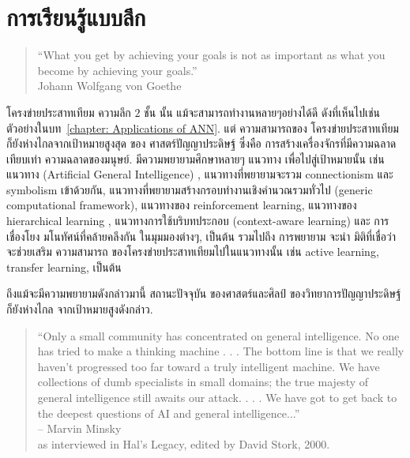 \chapter{การเรียนรู้แบบลึก}
\label{chapter: ANN deep learning}

\begin{verse}
``What you get by achieving your goals is not as important as what you become by achieving your goals.'' \\
Johann Wolfgang von Goethe
\end{verse}

โครงข่ายประสาทเทียม ความลึก $2$ ชั้น นั้น แม้จะสามารถทำงานหลายๆอย่างได้ดี ดังที่เห็นไปเช่น ตัวอย่างในบท~\ref{chapter: Applications of ANN}.
แต่ ความสามารถของ โครงข่ายประสาทเทียม ก็ยังห่างไกลจากเป้าหมายสูงสุด ของ ศาสตร์ปัญญาประดิษฐ์ ซึ่งคือ การสร้างเครื่องจักรที่มีความฉลาด เทียบเท่า ความฉลาดของมนุษย์.
มีความพยายามศึกษาหลายๆ แนวทาง เพื่อไปสู่เป้าหมายนั้น เช่น แนวทาง (Artificial General Intelligence)\cite{AGI2007a} , แนวทางที่พยายามจะรวม connectionism และ symbolism เข้าด้วยกัน\cite{Smolensky1988a, Smolensky1990a, ParkEtAl1995a}, แนวทางที่พยายามสร้างกรอบทำงานเชิงคำนวณรวมทั่วไป (generic computational framework)\cite{Prokopenko2014a}, แนวทางของ reinforcement learning, แนวทางของ hierarchical learning \cite{TaniNolfi1999a}, แนวทางการใช้บริบทประกอบ (context-aware learning)\cite{Turney1993a, SongEtAl2002a, FinkelEtAl2004a, SrinivasanEtAl2005a, GomesEtAl2011a} และ การเชื่องโยง มโนทัศน์ที่คล้ายคลึงกัน ในมุมมองต่างๆ, เป็นต้น รวมไปถึง การพยายาม จะนำ มิติที่เชื่อว่าจะช่วยเสริม ความสามารถ ของโครงข่ายประสาทเทียมไปในแนวทางนั้น เช่น active learning, transfer learning, เป็นต้น

ถึงแม้จะมีความพยายามดังกล่าวมานี้ สถานะปัจจุบัน ของศาสตร์และศิลป์ ของวิทยาการปัญญาประดิษฐ์ ก็ยังห่างไกล จากเป้าหมายสูงดังกล่าว.

\begin{verse}
``Only a small community has concentrated on general intelligence.
No one has tried to make a thinking machine . . .
The bottom line is that we really haven't progressed too far toward a truly intelligent machine. 
We have collections of dumb specialists in small domains; 
the true majesty of general intelligence still awaits our
attack. . . .
We have got to get back to the deepest questions of AI and general
intelligence...''
\\– Marvin Minsky
\\as interviewed in Hal’s Legacy, edited by David Stork, 2000.
\end{verse}

